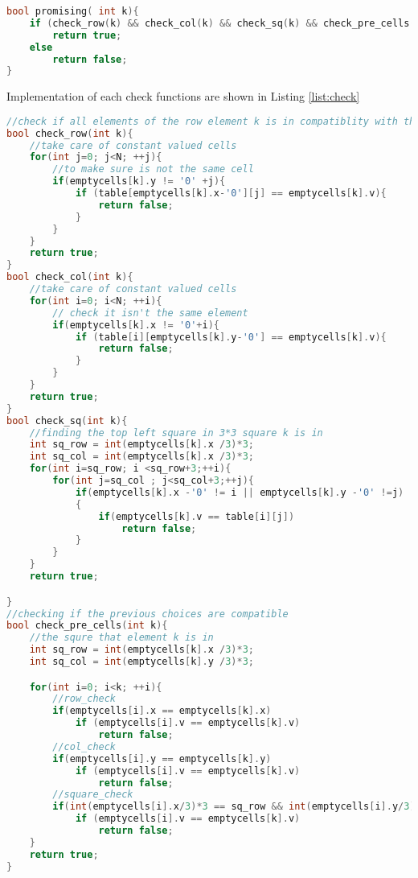 \begin{lstlisting}[style=mystyle,
language=C++, 
caption=promising function,
label=list:promising]
bool promising( int k){
    if (check_row(k) && check_col(k) && check_sq(k) && check_pre_cells(k))
        return true;
    else
        return false;
}
\end{lstlisting}

Implementation of each check functions are shown in Listing \ref{list:check}

\begin{lstlisting}[style=mystyle,
language=C++, 
caption=checking functions,
label=list:check]
//check if all elements of the row element k is in compatiblity with the choice of k
bool check_row(int k){
    //take care of constant valued cells
    for(int j=0; j<N; ++j){
        //to make sure is not the same cell
        if(emptycells[k].y != '0' +j){
            if (table[emptycells[k].x-'0'][j] == emptycells[k].v){
                return false;
            }
        }
    }
    return true;
}
bool check_col(int k){
    //take care of constant valued cells
    for(int i=0; i<N; ++i){
        // check it isn't the same element
        if(emptycells[k].x != '0'+i){
            if (table[i][emptycells[k].y-'0'] == emptycells[k].v){
                return false;
            }
        }
    }
    return true;
}
bool check_sq(int k){
    //finding the top left square in 3*3 square k is in 
    int sq_row = int(emptycells[k].x /3)*3;
    int sq_col = int(emptycells[k].x /3)*3;
    for(int i=sq_row; i <sq_row+3;++i){
        for(int j=sq_col ; j<sq_col+3;++j){
            if(emptycells[k].x -'0' != i || emptycells[k].y -'0' !=j)
            {
                if(emptycells[k].v == table[i][j])
                    return false;
            }
        }
    }
    return true;

}
//checking if the previous choices are compatible
bool check_pre_cells(int k){
    //the squre that element k is in 
    int sq_row = int(emptycells[k].x /3)*3;
    int sq_col = int(emptycells[k].y /3)*3;

    for(int i=0; i<k; ++i){
        //row_check
        if(emptycells[i].x == emptycells[k].x)
            if (emptycells[i].v == emptycells[k].v)
                return false;
        //col_check
        if(emptycells[i].y == emptycells[k].y)
            if (emptycells[i].v == emptycells[k].v)
                return false;
        //square_check
        if(int(emptycells[i].x/3)*3 == sq_row && int(emptycells[i].y/3)*3 == sq_col)
            if (emptycells[i].v == emptycells[k].v)
                return false;
    }
    return true;
}

\end{lstlisting}

